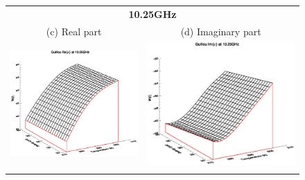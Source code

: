 \begin{figure}[htp]
\begin{tabular}{c c}
    \multicolumn{2}{c}{\sffamily\textbf{10.25GHz}}\\
    \textsf{(c) Real part} &
    \textsf{(d) Imaginary part} \\
    \includegraphics[bb=135 240 508 540,clip,scale=0.5]{graphics/Guillou/e_re_10.25GHz.eps} &
    \includegraphics[bb=135 240 508 540,clip,scale=0.5]{graphics/Guillou/e_im_10.25GHz.eps} \\\\


\end{tabular}
\end{figure}
